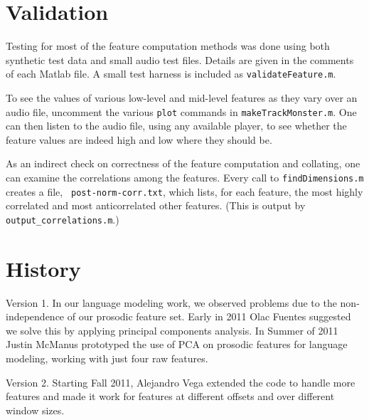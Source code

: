 \documentclass[11pt]{article}
\begin{document}
\section{Validation}   \label{sec:validation}

Testing for most of the feature computation methods was done using
both synthetic test data and small audio test files.  Details are
given in the comments of each Matlab file.  A small test harness is
included as {\tt validateFeature.m}.

To see the values of various low-level and mid-level features as they
vary over an audio file, uncomment the various {\tt plot} commands in
{\tt makeTrackMonster.m}.  One can then listen to the audio file,
using any available player, to see whether the feature values are
indeed high and low where they should be.

As an indirect check on correctness of the feature computation and
collating, one can examine the correlations among the features.  Every
call to {\tt findDimensions.m} creates a file, {\tt
  post-norm-corr.txt}, which lists, for each feature, the most highly
correlated and most anticorrelated other features.  (This is output by
{\tt output\_correlations.m}.)


\section{History}           \label{sec:history}

Version 1.  In our language  modeling work, we observed
problems due to the non-independence of our prosodic feature set.
Early in 2011 Olac Fuentes suggested we solve this by applying
principal components analysis.  In Summer of 2011 Justin McManus
prototyped the use of PCA on prosodic features for language modeling,
working with just four raw features.

Version 2. Starting Fall 2011, Alejandro Vega extended the code to
handle more features and made it work for features at different
offsets and over different window sizes.
\end{document}
